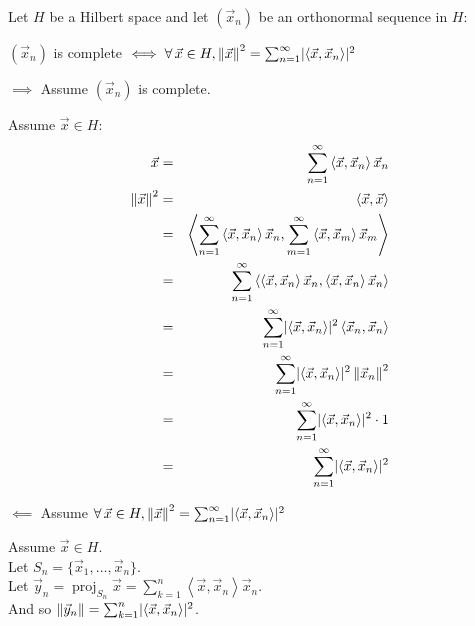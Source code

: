 \documentclass[letterpaper,12pt,fleqn]{article}
\newcommand{\vx}{\vec{x}}
\newcommand{\vy}{\vec{y}}
\newcommand{\vo}{\vec{0}}
\newcommand{\norm}[1]{\left\|#1\right\|}
\newcommand{\inner}[1]{\left<#1\right>}
\DeclareMathOperator{\proj}{proj}
\begin{document}
\begin{theorem} 
  Let $H$ be a Hilbert space and let $(\vx_n)$ be an orthonormal sequence in
  $H$:

  \qquad$(\vx_n)$ is complete $\iff\forall\,\vx\in H,\norm{\vx}^2=
  \sum_{n=1}^{\infty}\abs{\inner{\vx,\vx_n}}^2$
\end{theorem}

\begin{theproof}
  \listbreak
  \begin{description}
  \item $\implies$ Assume $(\vx_n)$ is complete.

    Assume $\vx\in H$:
    \begin{eqnarray*}
      \vx &=& \sum_{n=1}^{\infty}\inner{\vx,\vx_n}\vx_n \\
      \norm{\vx}^2 &=& \inner{\vx,\vx} \\
      &=& \inner{\sum_{n=1}^{\infty}\inner{\vx,\vx_n}\vx_n,
        \sum_{m=1}^{\infty}\inner{\vx,\vx_m}\vx_m} \\
      &=& \sum_{n=1}^{\infty}\inner{\inner{\vx,\vx_n}\vx_n,
        \inner{\vx,\vx_n}\vx_n} \\
      &=& \sum_{n=1}^{\infty}\abs{\inner{\vx,\vx_n}}^2\inner{\vx_n,\vx_n} \\
      &=& \sum_{n=1}^{\infty}\abs{\inner{\vx,\vx_n}}^2\norm{\vx_n}^2 \\
      &=& \sum_{n=1}^{\infty}\abs{\inner{\vx,\vx_n}}^2\cdot1 \\
      &=& \sum_{n=1}^{\infty}\abs{\inner{\vx,\vx_n}}^2
    \end{eqnarray*}

  \item $\impliedby$ Assume $\forall\,\vx\in H,\norm{\vx}^2=
    \sum_{n=1}^{\infty}\abs{\inner{\vx,\vx_n}}^2$

    Assume $\vx\in H$. \\
    Let $S_n=\{\vx_1,\ldots,\vx_n\}$. \\
    Let $\vy_n=\proj_{S_n}\vx=\sum_{k=1}^n\inner{\vx,\vx_n}\vx_n$. \\
    And so $\norm{\vy_n}=\sum_{k=1}^n\abs{\inner{\vx,\vx_n}}^2$. \\



\end{description}
\end{theproof}
\end{document}

